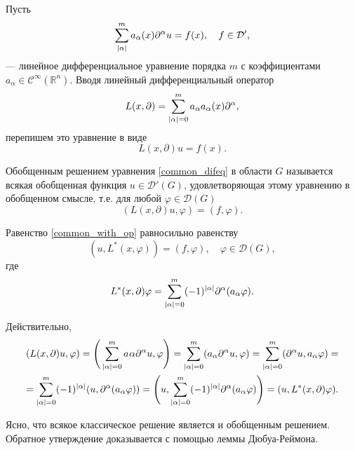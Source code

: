 Пусть 
\begin{equation}
	\label{common_difeq}
	\sum \limits_{\abs{\alpha}}^{m} a_{\alpha}(x) \partial^{\alpha} u = f(x), \quad f \in \mathcal{D}',
\end{equation}
--- линейное дифференциальное уравнение порядка $m$ с коэффициентами $a_{\alpha} \in \mathcal{C}^{\infty}(\mathbb{R}^n)$. Вводя линейный дифференциальный оператор 
\begin{equation*}
	L(x, \partial) = \sum \limits_{\abs{\alpha} = 0}^{m} a_{\alpha} a_{\alpha}(x) \partial^{\alpha},
\end{equation*}
перепишем это уравнение в виде 
\begin{equation}
	L(x, \partial) u = f(x).
\end{equation}

Обобщенным решением уравнения \eqref{common_difeq} в области $G$ называется всякая обобщенная функция $u \in \mathcal{D}'(G)$, удовлетворяющая этому уравнению в обобщенном смысле, т.е. для любой $\varphi \in \mathcal{D}(G)$
\begin{equation}
	\label{common_with_op}
	(L(x, \partial)u, \varphi) = (f, \varphi).
\end{equation}

Равенство \eqref{common_with_op} равносильно равенству
\begin{equation*}
	(u, L^{\ast}(x, \varphi)) = (f, \varphi), \quad \varphi \in \mathcal{D}(G),
\end{equation*}
где 
\begin{equation}
	L^{\ast}(x, \partial)\varphi = \sum \limits_{\abs{\alpha} = 0}^{m} (-1)^{\abs{\alpha}} \partial^{\alpha}(a_{\alpha} \varphi).
\end{equation}

Действительно,
\begin{gather*}
	(L(x, \partial) u, \varphi) = \Bigg(\sum \limits_{\abs{\alpha} = 0}^{m} a_{}\alpha \partial^{\alpha} u, \varphi\Bigg) = \sum\limits_{\abs{\alpha} = 0}^{m} (a_{\alpha} \partial^{\alpha} u, \varphi) = \sum\limits_{\abs{\alpha} = 0}^{m} (\partial^{\alpha} u, a_{\alpha} \varphi) = \\ = \sum\limits_{\abs{\alpha} = 0}^{m} (-1)^{\abs{\alpha}} (u, \partial^{\alpha}(a_{\alpha}\varphi)) = \Bigg(u, \sum\limits_{\abs{\alpha} = 0}^{m} (-1)^{\abs{\alpha}} \partial^{\alpha} (a_{\alpha} \varphi)\Bigg) = (u, L^{\ast}(x, \partial)\varphi).
\end{gather*}

Ясно, что всякое классическое решение является и обобщенным решением. Обратное утверждение доказывается с помощью леммы Дюбуа-Реймона. 